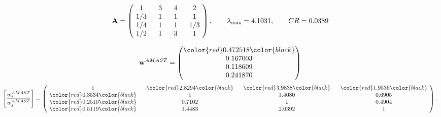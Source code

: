 \begin{example}
\begin{equation*}
\mathbf{A} =
\begin{pmatrix}
$\,\,$ 1 $\,\,$ & $\,\,$3$\,\,$ & $\,\,$4$\,\,$ & $\,\,$2 $\,\,$ \\
$\,\,$ 1/3$\,\,$ & $\,\,$ 1 $\,\,$ & $\,\,$1$\,\,$ & $\,\,$1 $\,\,$ \\
$\,\,$ 1/4$\,\,$ & $\,\,$ 1 $\,\,$ & $\,\,$ 1 $\,\,$ & $\,\,$ 1/3 $\,\,$ \\
$\,\,$ 1/2$\,\,$ & $\,\,$ 1 $\,\,$ & $\,\,$3$\,\,$ & $\,\,$ 1  $\,\,$ \\
\end{pmatrix},
\qquad
\lambda_{\max} =
4.1031,
\qquad
CR = 0.0389
\end{equation*}

\begin{equation*}
\mathbf{w}^{AMAST} =
\begin{pmatrix}
\color{red} 0.472518\color{black} \\
0.167003\\
0.118609\\
0.241870
\end{pmatrix}\end{equation*}
\begin{equation*}
\left[ \frac{{w}^{AMAST}_i}{{w}^{AMAST}_j} \right] =
\begin{pmatrix}
$\,\,$ 1 $\,\,$ & $\,\,$\color{red} 2.8294\color{black} $\,\,$ & $\,\,$\color{red} 3.9838\color{black} $\,\,$ & $\,\,$\color{red} 1.9536\color{black} $\,\,$ \\
$\,\,$\color{red} 0.3534\color{black} $\,\,$ & $\,\,$ 1 $\,\,$ & $\,\,$1.4080$\,\,$ & $\,\,$0.6905  $\,\,$ \\
$\,\,$\color{red} 0.2510\color{black} $\,\,$ & $\,\,$0.7102$\,\,$ & $\,\,$ 1 $\,\,$ & $\,\,$0.4904 $\,\,$ \\
$\,\,$\color{red} 0.5119\color{black} $\,\,$ & $\,\,$1.4483$\,\,$ & $\,\,$2.0392$\,\,$ & $\,\,$ 1  $\,\,$ \\
\end{pmatrix},
\end{equation*}


\end{example}
